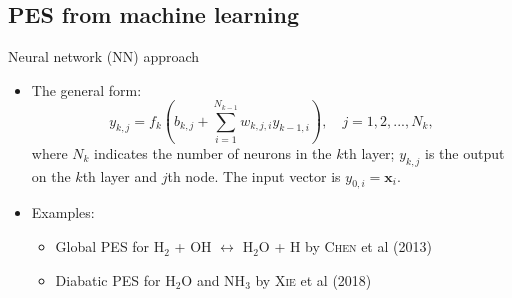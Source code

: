 \documentclass{beamer}
\begin{document}
\subsection{PES from machine learning}
\begin{frame}{Neural network (NN) approach}
    \begin{itemize}
        \item The general form:
            \begin{equation}
                y_{k,j} = f_k\left(b_{k,j} + \sum^{N_{k-1}}_{i=1}w_{k,j,i} y_{k-1,i}\right), \quad j=1,2,...,N_k,
                \label{eq:nnlayer}
            \end{equation}
            where $N_k$ indicates the number of neurons in the $k$th layer; $y_{k,j}$ is the output on the $k$th layer and $j$th node. The input vector is $y_{0,i} = \mathbf{x}_i$.
        \item Examples:
            \begin{itemize}
                \item Global PES for H$_2$ + OH $\leftrightarrow$ H$_2$O + H by \textsc{Chen} et al (2013)
                \item Diabatic PES for H$_2$O and NH$_3$ by \textsc{Xie} et al (2018)
            \end{itemize}
    \end{itemize}
\end{frame}
\end{document}
